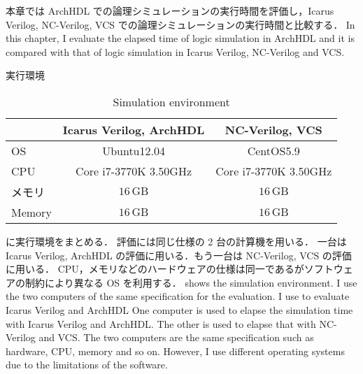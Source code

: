 本章では ArchHDL での論理シミュレーションの実行時間を評価し，Icarus Verilog, NC-Verilog, VCS での論理シミュレーションの実行時間と比較する．
\fi
In this chapter, I evaluate the elapsed time of logic simulation in ArchHDL and it is compared with that of logic simulation in Icarus Verilog, NC-Verilog and VCS.

\begin{table}[t]
 \caption{実行環境}
\fi
 \caption{Simulation environment}
 \label{table:exec_env}
 \begin{center}
  \begin{tabular}{l|c|c} \hline
         &  Icarus Verilog, ArchHDL  &  NC-Verilog, VCS   \\ \hline
  OS     &  Ubuntu12.04             &  CentOS5.9        \\
  CPU    &  Core i7-3770K 3.50GHz   &  Core i7-3770K 3.50GHz  \\
\if0
  メモリ  &  $16\,\mathrm{GB}$       &  $16\,\mathrm{GB}$  \\ \hline
\fi
   Memory &  $16\,\mathrm{GB}$       &  $16\,\mathrm{GB}$  \\ \hline
  \end{tabular}
 \end{center}
\end{table}

 に実行環境をまとめる．
評価には同じ仕様の 2 台の計算機を用いる．
一台は Icarus Verilog, ArchHDL の評価に用いる．もう一台は NC-Verilog, VCS の評価に用いる．
CPU，メモリなどのハードウェアの仕様は同一であるがソフトウェアの制約により異なる OS を利用する．
\fi
{} shows the simulation environment.
I use the two computers of the same specification for the evaluation.
I use to evaluate Icarus Verilog and ArchHDL
One computer is used to elapse the simulation time with Icarus Verilog and ArchHDL.
The other is used to elapse that with NC-Verilog and VCS.
The two computers are the same specification such as hardware, CPU, memory and so on.
However, I use different operating systems due to the limitations of the software.

